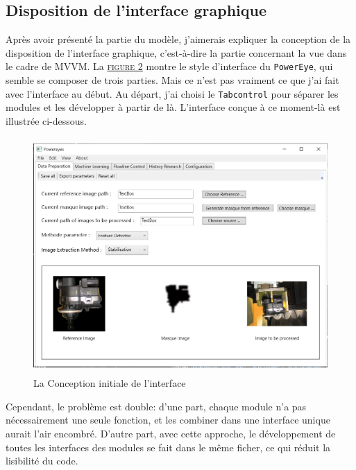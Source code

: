 \subsection{Disposition de l'interface graphique}
Après avoir présenté la partie du modèle, j'aimerais expliquer la conception de la disposition de l'interface graphique, c'est-à-dire la partie concernant la vue dans le cadre de MVVM. La \hyperref[fig:target]{\textsc{figure 2}} montre le style d'interface du \texttt{PowerEye}, qui semble se composer de trois parties. Mais ce n'est pas vraiment ce que j'ai fait avec l'interface au début. Au départ, j'ai choisi le \texttt{Tabcontrol} pour séparer les modules et les développer à partir de là. L'interface conçue à ce moment-là est illustrée ci-dessous.
\begin{figure}[H]
    \centering
    \includegraphics[height=9cm]{ressources/images/Interface_original.png}
    \caption{La Conception initiale de l'interface}
\end{figure}

Cependant, le problème est double: d'une part, chaque module n'a pas nécessairement une seule fonction, et les combiner dans une interface unique aurait l'air encombré. D'autre part, avec cette approche, le développement de toutes les interfaces des modules se fait dans le même ficher, ce qui réduit la lisibilité du code.

